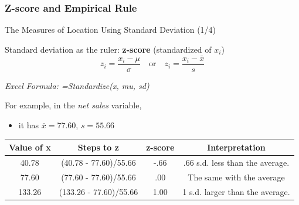 \documentclass{beamer}
\begin{document}
\subsubsection{Z-score and Empirical Rule}
\begin{frame}{The Measures of Location Using Standard Deviation (1/4)}

Standard deviation as the ruler: \textbf{z-score} (standardized of $x_i$)
$$ z_i = \frac{x_i - \mu}{\sigma} \quad\text{or}\quad z_i = \frac{x_i - \bar{x}}{s} $$

\begin{flushright}
\textit{Excel Formula: =Standardize(x, mu, sd)
}
\end{flushright}
For example, in the \textit{net sales} variable, 
\begin{itemize}
\item it has $\bar{x} = 77.60$, $s = 55.66$
\end{itemize}



\begin{center}
\begin{scriptsize}
\begin{tabular}{c|c|c|c}
\hline 
Value of x & Steps to z & z-score & Interpretation \\ 
\hline 
40.78 & (40.78 - 77.60)/55.66 & -.66 & .66 s.d. less than the average. \\ 
\hline 
77.60 & (77.60 - 77.60)/55.66 & .00 & The same with the average \\ 
\hline 
133.26 & (133.26 - 77.60)/55.66 & 1.00 & 1 s.d. larger than the average. \\ 
\hline 
\end{tabular} 
\end{scriptsize}
\end{center}

\end{frame}
\end{document}
